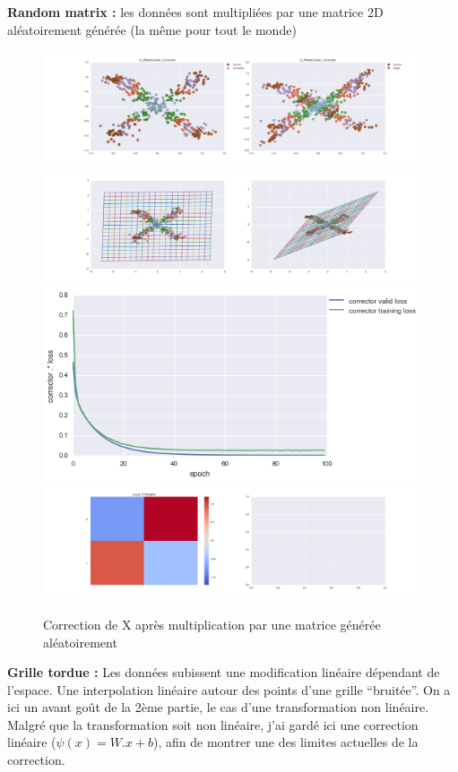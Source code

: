 {\Large \textbf{Random matrix :}} les données sont multipliées par une matrice 2D aléatoirement générée
 (la même pour tout le monde)

\begin{figure}[H] %
\centering
\includegraphics[width=\linewidth]{fig/24-05-2016/X/X_RMatCluster_Corrector-DATA.png}
\includegraphics[width=\linewidth]{fig/24-05-2016/X/X_RMatCluster_Corrector-GridCheck.png}
\includegraphics[width=0.45\linewidth]{fig/24-05-2016/X/X_RMatCluster_Corrector-Learning_curve.png}
\includegraphics[width=\linewidth]{fig/24-05-2016/X/X_RMatCluster_Corrector-W.png}
\caption{Correction de X après multiplication par une matrice générée aléatoirement}
\label{fig:recap-X-RMat-cluster}
\end{figure}


{\Large \textbf{Grille tordue :}} Les données subissent une modification linéaire dépendant de l'espace.
Une interpolation linéaire autour des points d'une grille ``bruitée''.
On a ici un avant goût de la 2ème partie, le cas d'une transformation non linéaire.
Malgré que la transformation soit non linéaire, j'ai gardé ici une correction linéaire ($\psi(x) = W.x+b$),
afin de montrer une des limites actuelles de la correction.

